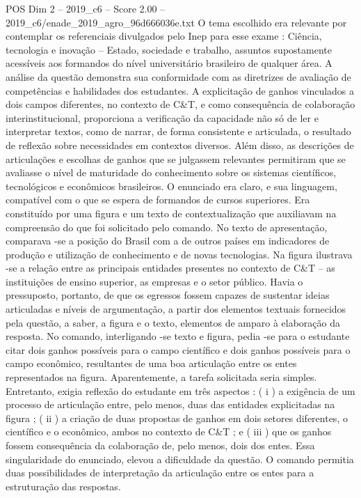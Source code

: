 \begin{textsample}{POS Dim 2 – 2019\_c6 – Score 2.00 – 2019\_c6/enade\_2019\_agro\_96d666036e.txt}
O tema escolhido era relevante por contemplar os referenciais divulgados pelo Inep para esse exame : Ciência, tecnologia e inovação – Estado, sociedade e trabalho, assuntos supostamente acessíveis aos formandos do nível universitário brasileiro de qualquer área.
A análise da questão demonstra sua conformidade com as diretrizes de avaliação de competências e habilidades dos estudantes.
A explicitação de ganhos vinculados a dois campos diferentes, no contexto de C\&T, e como consequência de colaboração interinstitucional, proporciona a verificação da capacidade não só de ler e interpretar textos, como de narrar, de forma consistente e articulada, o resultado de reflexão sobre necessidades em contextos diversos.
Além disso, as descrições de articulações e escolhas de ganhos que se julgassem relevantes permitiram que se avaliasse o nível de maturidade do conhecimento sobre os sistemas científicos, tecnológicos e econômicos brasileiros.
O enunciado era claro, e sua linguagem, compatível com o que se espera de formandos de cursos superiores.
Era constituído por uma figura e um texto de contextualização que auxiliavam na compreensão do que foi solicitado pelo comando.
No texto de apresentação, comparava -se a posição do Brasil com a de outros países em indicadores de produção e utilização de conhecimento e de novas tecnologias.
Na figura ilustrava -se a relação entre as principais entidades presentes no contexto de C\&T – as instituições de ensino superior, as empresas e o setor público.
Havia o pressuposto, portanto, de que os egressos fossem capazes de sustentar ideias articuladas e níveis de argumentação, a partir dos elementos textuais fornecidos pela questão, a saber, a figura e o texto, elementos de amparo à elaboração da resposta.
No comando, interligando -se texto e figura, pedia -se para o estudante citar dois ganhos possíveis para o campo científico e dois ganhos possíveis para o campo econômico, resultantes de uma boa articulação entre os entes representados na figura.
Aparentemente, a tarefa solicitada seria simples.
Entretanto, exigia reflexão do estudante em três aspectos : ( i ) a exigência de um processo de articulação entre, pelo menos, duas das entidades explicitadas na figura ; ( ii ) a criação de duas propostas de ganhos em dois setores diferentes, o científico e o econômico, ambos no contexto de C\&T ; e ( iii ) que os ganhos fossem consequência da colaboração de, pelo menos, dois dos entes.
Essa singularidade do enunciado, elevou a dificuldade da questão.
O comando permitia duas possibilidades de interpretação da articulação entre os entes para a estruturação das respostas.

\end{textsample}
